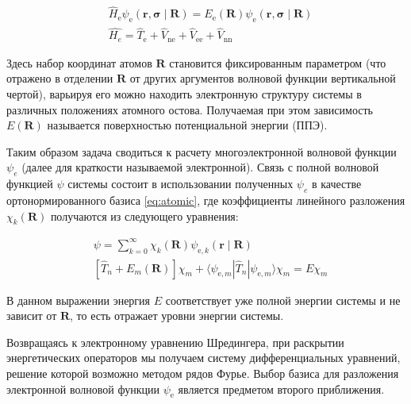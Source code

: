 \documentclass[12pt]{extarticle}
\renewcommand{\vec}{\mathbf}
\begin{document}
        \begin{equation} \label{eq:born-opper}
    	\begin{split}
    		&\hat{H}_\text{e} \psi_\text{e}(\vec{r}, \vec{\sigma} \mid \vec{R})=E_\text{e}(\vec{R}) \psi_\text{e}(\vec{r}, \vec{\sigma} \mid \vec{R}) \\
    		&\hat{H_e} = \hat{T}_\text{e}+\hat{V}_\text{ne}+\hat{V}_\text{ee}+\hat{V}_\text{nn}
    	\end{split}
    \end{equation}
    
    Здесь набор координат атомов $\vec{R}$ становится фиксированным параметром (что отражено в отделении $\vec{R}$ от других аргументов волновой функции вертикальной чертой), варьируя его можно находить электронную структуру системы в различных положениях атомного остова. Получаемая при этом зависимость $E(\vec{R})$ называется поверхностью потенциальной энергии (ППЭ).
    
    Таким образом задача сводиться к расчету многоэлектронной волновой функции $\psi_e$ (далее для краткости называемой электронной). Связь с полной волновой функцией $\psi$ системы состоит в использовании полученных $\psi_e$ в качестве ортонормированного базиса \ref{eq:atomic}, где коэффициенты линейного разложения $\chi_k(\vec{R})$ получаются из следующего уравнения:
    
    \begin{equation} \label{eq:atomic}
    	\begin{split}
    		&\psi=\sum_{k=0}^{\infty} \chi_k(\vec{R}) \psi_{\text{e}, k}(\vec{r} \mid \vec{R}) \\
    		&\left[\hat{T}_n+E_m(\vec{R})\right] \chi_m+\langle \psi_{\text{e}, m} | \hat{T}_n | \psi_{\text{e}, m} \rangle \chi_m=E \chi_m
    	\end{split}
    \end{equation}
    
    В данном выражении энергия $E$ соответствует уже полной энергии системы и не зависит от $\vec{R}$, то есть отражает уровни энергии системы.
    
    Возвращаясь к электронному уравнению Шредингера, при раскрытии энергетических операторов мы получаем систему дифференциальных уравнений, решение которой возможно методом рядов Фурье. Выбор базиса для разложения электронной волновой функции $\psi_\text{e}$ является предметом второго приближения.
    
\end{document}
